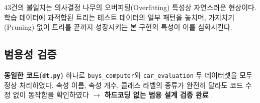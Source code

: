 \documentclass[12pt, a4paper]{article}
\newcommand{\cmark}{\ding{51}}
\begin{document}
43건의 불일치는 의사결정 나무의 오버피팅(Overfitting) 특성상 자연스러운 현상이다. 학습 데이터에 과적합된 트리는 테스트 데이터의 일부 패턴을 놓치며, 가지치기(Pruning) 없이 트리를 끝까지 성장시키는 본 구현의 특성이 이를 심화시킨다.

\subsection{범용성 검증}

\textbf{동일한 코드(\texttt{dt.py})} 하나로 \texttt{buys\_computer}와 \texttt{car\_evaluation} 두 데이터셋을 모두 정상 처리하였다. 속성 이름, 속성 개수, 클래스 라벨의 종류가 완전히 달라도 코드 수정 없이 동작함을 확인하였다 $\to$ \textbf{하드코딩 없는 범용 설계 검증 완료} \cmark.
\end{document}
